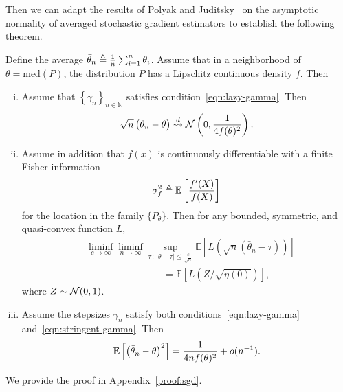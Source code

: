 Then we can adapt the results of Polyak and Juditsky~\cite{PolyakJu92}
on the asymptotic normality of averaged stochastic gradient estimators
to establish the following theorem.
\begin{thm}
  \label{thm:sgd}
  Define the average $\bar{\theta}_n \triangleq \frac{1}{n}
  \sum_{i = 1}^n \theta_i$. Assume
  that in a neighborhood
  of $\theta = \mbox{med}(P)$,
  the distribution $P$ has a Lipschitz continuous density $f$.
  Then
  \begin{enumerate}[(i)]
  \item \label{item:normal-sgd}
    Assume that $\left\{ \gamma_n \right\}_{n\in \mathbb N}$ satisfies
    condition~\eqref{eqn:lazy-gamma}.
    Then
    \begin{equation*}
      \sqrt{n}\left( \bar{\theta}_n - \theta\right)
      \stackrel{d}{\rightsquigarrow} \mathcal{N}\left(0,\frac{1}{4 f(\theta)^2}\right).
    \end{equation*}
  \item
    Assume in addition that $f(x)$ is continuously differentiable with a
    finite Fisher information
    \begin{equation*}
      \sigma_f^2 \triangleq \mathbb{E}\left[ \frac{f'(X)}{f(X)} \right] 
    \end{equation*}
    for the location in the family $\{P_\theta\}$.
    Then for any bounded, symmetric, and quasi-convex function $L$, 
    \begin{align} 
      & \liminf_{c \to \infty} \liminf_{n \to \infty} \sup_{\tau\,:\,|\theta-\tau| \leq \frac{c}{\sqrt{n} }}  \mathbb E \left[ L\left( \sqrt{n}(\bar{\theta}_{n} - \tau) \right) \right] \nonumber 
      \\
      & \qquad \qquad \qquad \qquad = \mathbb E \left[ L (Z/\sqrt{\eta(0)}) \right], \label{eq:attaining_LAM}
    \end{align}
    where $Z \sim \mathcal{N}(0,1)$. 
  \item Assume the stepsizes $\gamma_n$ satisfy both
    conditions~\eqref{eqn:lazy-gamma} and~\eqref{eqn:stringent-gamma}.
    Then
    \begin{equation*}
      \mathbb{E}\left[ \left( \bar{\theta}_n - \theta \right)^2\right] = \frac{1}{4 n f(\theta)^2} + o(n^{-1}). 
    \end{equation*}
  \end{enumerate}
\end{thm}

\noindent
We provide the proof in Appendix~\ref{proof:sgd}.

